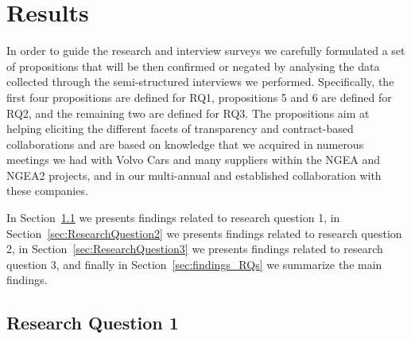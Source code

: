 \section{Results}\label{sec:results}

In order to guide the
research and interview surveys %
we carefully formulated a set of propositions that will be then confirmed or negated by analysing the data collected through the semi-structured interviews we performed. Specifically, the first four propositions are defined for RQ1, propositions  5 and 6 are defined for RQ2,  and the remaining two are defined for RQ3.
The propositions aim at helping eliciting the different facets of transparency and contract-based collaborations and are based on knowledge that we acquired in numerous meetings we had with Volvo Cars and many suppliers within the NGEA and NGEA2 projects, and in our multi-annual and established collaboration with these companies. %



In Section~\ref{sec:ResearchQuestion1} we presents findings related to research question 1, in Section~\ref{sec:ResearchQuestion2} we presents findings related to research question 2,  in Section~\ref{sec:ResearchQuestion3} we presents findings related to research question 3, and finally
 in Section~\ref{sec:findings_RQs} we summarize the main findings.

\subsection{Research Question 1}\label{sec:ResearchQuestion1}

